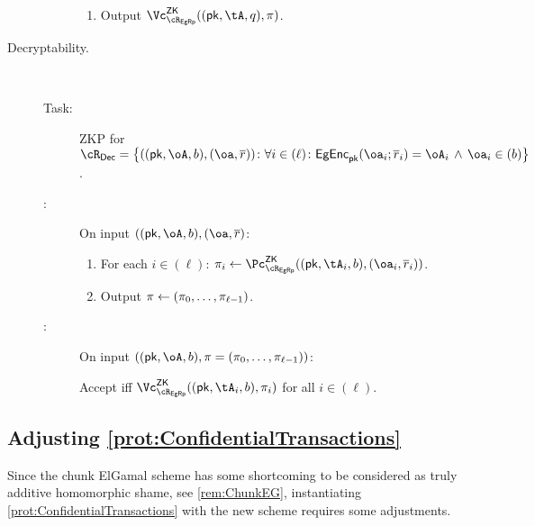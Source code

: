 \begin{description}
\begin{description}
\begin{enumerate}
		\item  Output $\vZK{\rEgRp}((\pk,\tA,q), \pi)$.
		
	\end{enumerate}
\end{description}
 


\item[Decryptability.]  ~


\begin{description}
	\item[Task:] ZKP for $\rDec =\rDecDef$.
	
	\item[\Pc:] On  input  $((\pk,\oA,b),(\oa,\orr)$:
	
	\begin{enumerate}
		\item For each $i\in (\ell)$: $\pi_i \asn \pZK{\rEgRp}((\pk,\tA_i,b), (\oa_i,\orr_i))$.
		\item Output $\pi \leftarrow (\pi_0,\ldots, \pi_{\ell-1})$.
	\end{enumerate}
	 
	 
	 	\item[\Vc:] On  input  $((\pk,\oA,b), \pi= (\pi_0,\ldots, \pi_{\ell-1}))$:
	 
	 Accept iff  $\vZK{\rEgRp}((\pk,\tA_i,b), \pi_i)$ for all $i\in (\ell)$.
	 
	 
\end{description}


\end{description}


\subsection{Adjusting  \cref{prot:ConfidentialTransactions}}\label{sec:ChanksEG:Adjusting}
Since the chunk ElGamal  scheme has some shortcoming to be considered as truly additive  homomorphic shame, see \cref{rem:ChunkEG}, instantiating \cref{prot:ConfidentialTransactions} with the new scheme  requires some adjustments.


